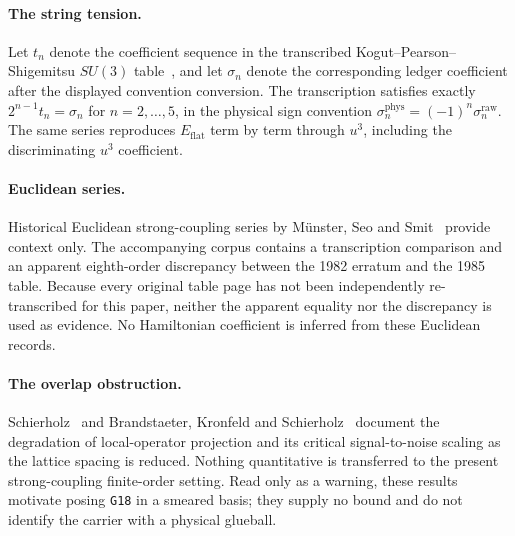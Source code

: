 \documentclass[11pt]{article}
\theoremstyle{plain}
\theoremstyle{definition}
\theoremstyle{remark}
\newcommand{\chk}[1]{}
\begin{document}
\paragraph{The string tension.} Let $t_n$ denote the coefficient sequence in
the transcribed Kogut--Pearson--Shigemitsu $SU(3)$ table~\cite{KPS1981}, and
let $\sigma_n$ denote the corresponding ledger coefficient after the displayed
convention conversion. The transcription satisfies exactly
$2^{n-1}t_n=\sigma_n$ for $n=2,\dots,5$, in the physical sign convention
$\sigma_n^{\mathrm{phys}}=(-1)^n\sigma_n^{\mathrm{raw}}$. The same series
reproduces $E_{\mathrm{flat}}$ term by term through $u^3$, including the
discriminating $u^3$ coefficient.
\chk{the KPS 1980 string-tension table equals the certified sigma series EXACTLY}
\chk{sigma\_n\^{}phys = (-1)\^{}n sigma\_n\^{}raw, and C5 is the n = 3 case}
\chk{the ratio and sigma series reproduce E\_flat exactly}

\paragraph{Euclidean series.} Historical Euclidean strong-coupling series by
M\"unster, Seo and Smit~\cite{Munster1981,Seo1982,Smit1982,Munster1983,Munster1985}
provide context only. The accompanying corpus contains a transcription
comparison and an apparent eighth-order discrepancy between the 1982 erratum
and the 1985 table. Because every original table page has not been
independently re-transcribed for this paper, neither the apparent equality nor
the discrepancy is used as evidence. No Hamiltonian coefficient is inferred
from these Euclidean records.
\chk{the errata-resolved Euclidean series is doubly sourced, transcription for transcription}
\chk{FINDING: Munster's 1985 table shifts his 1982 erratum at eighth order}

\paragraph{The overlap obstruction.} Schierholz~\cite{Schierholz1988} and
Brandstaeter, Kronfeld and Schierholz~\cite{BKS1990} document the degradation
of local-operator projection and its critical signal-to-noise scaling as the
lattice spacing is reduced. Nothing quantitative is transferred to the
present strong-coupling finite-order setting. Read only as a warning, these
results motivate posing \texttt{G18} in a smeared basis; they supply no bound
and do not identify the carrier with a physical glueball.
\chk{the overlap obstruction was published in 1988, and it scales}
\end{document}
